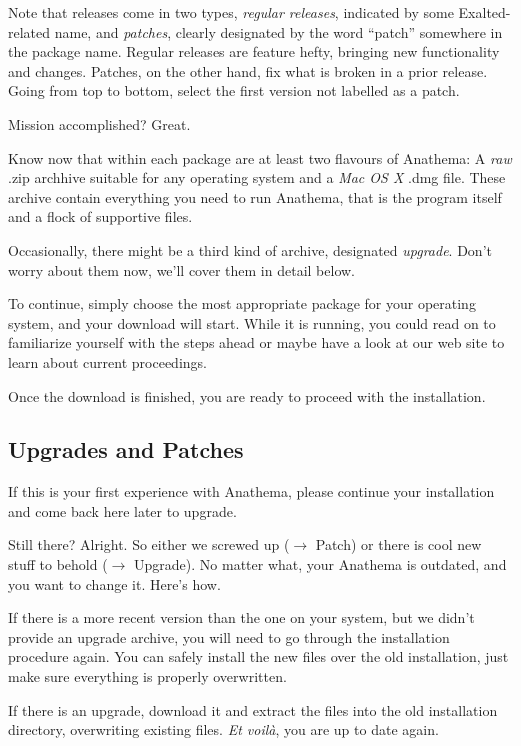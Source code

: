 Note that releases come in two types, \emph{regular releases}, indicated by some Exalted-related name, and \emph{patches}, clearly designated by the word ``patch'' somewhere in the package name.
Regular releases are feature hefty, bringing new functionality and changes. Patches, on the other hand, fix what is broken in a prior release. 
Going from top to bottom, select the first version not labelled as a patch.

Mission accomplished? Great.

Know now that within each package are at least two flavours of Anathema: A \emph{raw} .zip archhive suitable for any operating system and a \emph{Mac OS X} .dmg file. These archive contain everything you need to run Anathema, that is the program itself and a flock of supportive files. 

Occasionally, there might be a third kind of archive, designated \emph{upgrade}. Don't worry about them now, we'll cover them in detail below.

To continue, simply choose the most appropriate package for your operating system, and your download will start. While it is running, you could read on to familiarize yourself with the steps ahead or maybe have a look at our web site to learn about current proceedings.
\medskip

Once the download is finished, you are ready to proceed with the installation.

\subsection{Upgrades and Patches}
If this is your first experience with Anathema, please continue your installation and come back here later to upgrade.

Still there? Alright. So either we screwed up ($\rightarrow$ Patch) or there is cool new stuff to behold ($\rightarrow$ Upgrade). No matter what, your Anathema is outdated, and you want to change it. Here's how.

If there is a more recent version than the one on your system, but we didn't provide an upgrade archive, you will need to go through the installation procedure again. You can safely install the new files over the old installation, just make sure everything is properly overwritten.

If there is an upgrade, download it and extract the files into the old installation directory, overwriting existing files. \emph{Et voil\`a}, you are up to date again.

